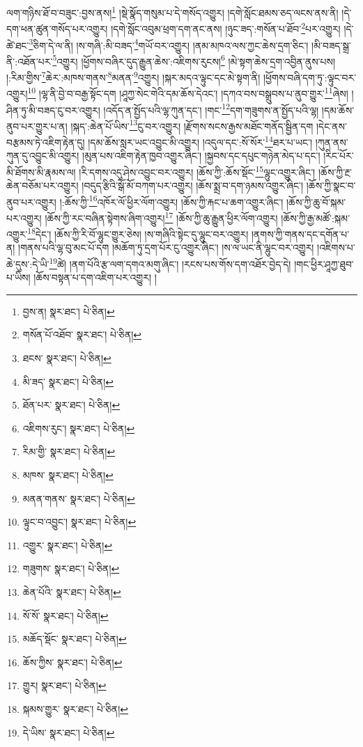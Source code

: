 ལག་གཉིས་ཐོ་བ་བཟུང་:བྱས་ནས།\footnote{བྱས་ན།  སྣར་ཐང་།  པེ་ཅིན། } །སྡེ་སྣོད་གསུམ་པ་དེ་གསོད་འགྱུར། །དགེ་སློང་ཐམས་ཅད་ལངས་ནས་ནི། །དེ་དག་ཕན་ཚུན་གསོད་པར་འགྱུར། །དགེ་སློང་འབུམ་ཕྲག་དག་ནང་ནས། །ཉུང་ཟད་:གསོན་པ་ཐོབ་\footnote{གསོན་པོ་འཐོབ་  སྣར་ཐང་།  པེ་ཅིན། }པར་འགྱུར། །དེ་ཚེ་ཐང་\footnote{ཐངས་  སྣར་ཐང་།  པེ་ཅིན། }ཅིག་དེ་ལ་ནི། །ས་གཞི་:མི་བཟད་\footnote{མི་ཟད་  སྣར་ཐང་།  པེ་ཅིན། }གཡོ་བར་འགྱུར། །ནམ་མཁའ་ལས་ཀྱང་ཆེས་དྲག་ཅིང་། །མི་བཟད་སྒྲ་ནི་:འཐོན་པར་\footnote{ཐོན་པར་  སྣར་ཐང་།  པེ་ཅིན། }འགྱུར། །ཕྱོགས་བཞིར་དུད་རྒྱུན་ཆེས་:འཇིགས་རུངས།\footnote{འཇིགས་རུང་།  སྣར་ཐང་།  པེ་ཅིན། } །མེ་སྟག་ཆེས་དྲག་འབྱིན་ནུས་པས། །:རིམ་གྱིས་\footnote{རིམ་གྱི་  སྣར་ཐང་།  པེ་ཅིན། }ཆེར་:མཁས་གནས་\footnote{མཁས་  སྣར་ཐང་།  པེ་ཅིན། }མནན་\footnote{མནན་གནས་  སྣར་ཐང་།  པེ་ཅིན། }འགྱུར། །སྐར་མདའ་ལྟུང་དང་མེ་སྟག་ནི། །ཕྱོགས་བཞི་དག་ཏུ་:ལྟུང་བར་འགྱུར།\footnote{ལྟུང་བ་འབྱུང་།  སྣར་ཐང་།  པེ་ཅིན། } །ལྷ་ནི་བྱེ་བ་བརྒྱ་སྟོང་དག །ཤཱཀྱ་སེང་གེའི་དམ་ཆོས་དེའང་། །དཀའ་བས་བསྒྲུབས་པ་ནུབ་གྱུར་\footnote{འགྱུར་  སྣར་ཐང་།  པེ་ཅིན། }ཞེས། །ཤིན་ཏུ་མི་བཟད་ངུ་བར་འགྱུར། །འདོད་ན་སྤྱོད་པའི་ལྷ་ཀུན་དང་། །གང་\footnote{གཟུགས་  སྣར་ཐང་།  པེ་ཅིན། }དག་གཟུགས་ན་སྤྱོད་པའི་ལྷ། །དམ་ཆོས་ནུབ་པར་གྱུར་པ་ན། །སྐད་:ཆེན་པོ་ཡིས་\footnote{ཆེན་པོའི་  སྣར་ཐང་།  པེ་ཅིན། }ངུ་བར་འགྱུར། །རྫོགས་སངས་རྒྱས་མཐོང་གནོད་སྦྱིན་དག །དེང་ནས་བརྩམས་ཏེ་འཇིག་རྟེན་དུ། །དམ་ཆོས་སླར་ཡང་འབྱུང་མི་འགྱུར། །འདུལ་དང་:སོ་སོར་\footnote{སོ་སོ་  སྣར་ཐང་།  པེ་ཅིན། }ཐར་པ་ཡང་། །ཀུན་ནས་ཀུན་དུ་འབྱུང་མི་འགྱུར། །མུན་པས་འཇིག་རྟེན་ཁྱབ་འགྱུར་ཞིང་། །སྐྱབས་དང་དཔུང་གཉེན་མེད་པ་དང་། །རིང་པོར་མི་ཐོགས་མི་རྣམས་ལ། །རི་དགས་འདུ་ཤེས་འབྱུང་བར་འགྱུར། །ཆོས་ཀྱི་:ཆོས་སྡོང་\footnote{མཆོད་སྡོང་  སྣར་ཐང་།  པེ་ཅིན། }ལྷུང་འགྱུར་ཞིང་། །ཆོས་ཀྱི་རྔ་ཆེན་བཅོམ་པར་འགྱུར། །བདུད་རྩིའི་སྒོ་མོ་བཀག་པར་འགྱུར། །ཆོས་སྨྲ་བ་དག་ཉམས་འགྱུར་ཞིང་། །ཆོས་ཀྱི་སྣང་བ་ནུབ་པར་འགྱུར། །:ཆོས་ཀྱི་\footnote{ཆོས་ཀྱིས་  སྣར་ཐང་།  པེ་ཅིན། }འཁོར་ལོ་ཕྱིར་ལོག་འགྱུར། །ཆོས་ཀྱི་རྐང་པ་ཆག་འགྱུར་ཞིང་། །ཆོས་ཀྱི་ཆུ་བོ་སྐམ་པར་འགྱུར། །ཆོས་ཀྱི་རང་བཞིན་སྟེགས་ཞིག་འགྱུར།\footnote{གྱུར།  སྣར་ཐང་།  པེ་ཅིན། } །ཆོས་ཀྱི་ཆུ་རྒྱུན་ཕྱིར་ལོག་འགྱུར། །ཆོས་ཀྱི་རྒྱ་མཚོ་:སྐམ་འགྱུར་\footnote{སྐམས་གྱུར་  སྣར་ཐང་།  པེ་ཅིན། }དེང་། །ཆོས་ཀྱི་རི་བོ་ལྷུང་གྱུར་ཅེས། །ས་གཞིའི་སྟེང་དུ་ལྷུང་བར་འགྱུར། །ནགས་ཀྱི་གནས་དང་དགོན་པ་ན། །གནས་པའི་ལྷ་བུ་མང་པོ་དག །མཆོག་ཏུ་དྲག་པོར་ངུ་འགྱུར་ཞིང་། །ས་ལ་ཡང་ནི་ལྷུང་བར་འགྱུར། །འཇིགས་པ་ཆེ་དུས་:དེ་ཡི་\footnote{དེ་ཡིས་  སྣར་ཐང་།  པེ་ཅིན། }ཚེ། །ནག་པོའི་རྩ་ལག་དགའ་མགུ་ཞིང་། །རངས་པས་གོས་དག་འཐོར་བྱེད་དེ། །གང་ཕྱིར་ཤཱཀྱ་ཐུབ་པ་ཡིས། །ཆོས་བསྟན་པ་དག་འཇིག་པར་འགྱུར། །
